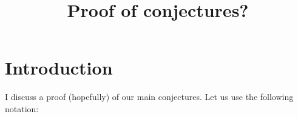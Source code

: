 \documentclass[a4paper]{amsart}
\theoremstyle{plain}
\theoremstyle{definition}
\begin{document}
\title{Proof of conjectures?}


%
%

%




\maketitle

\section{Introduction}
I discuss a proof (hopefully) of our main conjectures.
Let us use the following notation:
\end{document}
